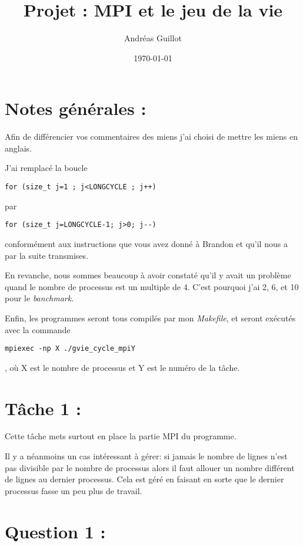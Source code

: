 \documentclass{article}
\title{Projet : MPI et le jeu de la vie}
\author{Andréas Guillot}
\date{\today}
\begin{document}
\maketitle

\section{Notes générales :}

Afin de différencier vos commentaires des miens j'ai choisi de mettre les miens en anglais.

J'ai remplacé la boucle
\begin{verbatim}
for (size_t j=1 ; j<LONGCYCLE ; j++)
\end{verbatim} par \begin{verbatim}
for (size_t j=LONGCYCLE-1; j>0; j--)
\end{verbatim} conformément aux instructions que vous avez donné à Brandon et qu'il nous a par la suite transmises.

\medskip

En revanche, nous sommes beaucoup à avoir constaté qu'il y avait un problème quand le nombre de processus est un multiple de 4. C'est pourquoi j'ai 2, 6, et 10 pour le \textit{banchmark}.

\medskip

Enfin, les programmes seront tous compilés par mon \textit{Makefile}, et seront exécutés avec la commande \begin{verbatim}
mpiexec -np X ./gvie_cycle_mpiY
\end{verbatim}, où X est le nombre de processus et Y est le numéro de la tâche.

\section{Tâche 1 :}

Cette tâche mets surtout en place la partie MPI du programme.

\medskip

Il y a néanmoins un cas intéressant à gérer: si jamais le nombre de lignes n'est pas divisible par le nombre de processus alors il faut allouer un nombre différent de lignes au dernier processus.
Cela est géré en faisant en sorte que le dernier processus fasse un peu plus de travail.

\section{Question 1 :}
\end{document}
